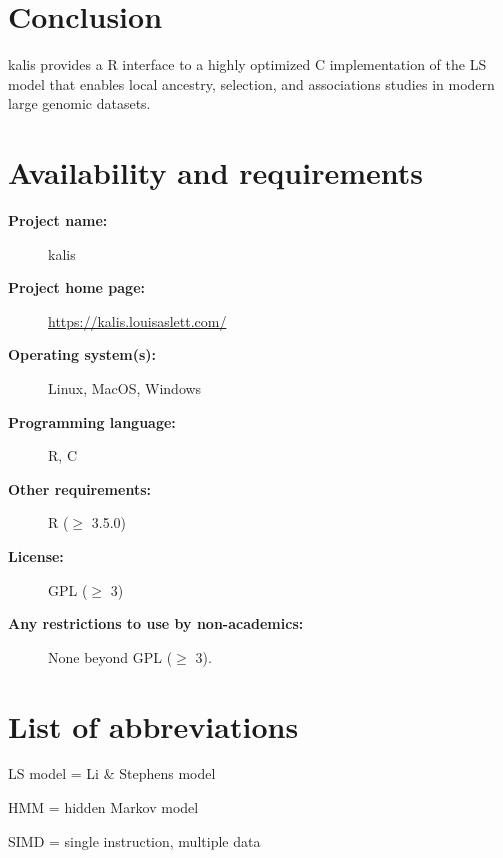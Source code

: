 \documentclass[pdflatex,referee,lineno,sn-nature]{sn-jnl}%
\let\proglang=\textsf
\newcommand{\pkg}[1]{{\fontseries{m}\fontseries{b}\selectfont #1}}
\begin{document}
\section*{Conclusion}

\pkg{kalis} provides a \proglang{R} interface to a highly optimized \proglang{C} implementation of the LS model that enables local ancestry, selection, and associations studies in modern large genomic datasets.



\section*{Availability and requirements}

\begin{description}
	\item[\textbf{Project name:}] \pkg{kalis}
	\item[\textbf{Project home page:}] \url{https://kalis.louisaslett.com/}
	\item[\textbf{Operating system(s):}] Linux, MacOS, Windows
	\item[\textbf{Programming language:}] \proglang{R}, \proglang{C}
	\item[\textbf{Other requirements:}] R ($\geq$ 3.5.0)
	\item[\textbf{License:}] GPL ($\geq$ 3)
	\item[\textbf{Any restrictions to use by non-academics:}] None beyond GPL ($\geq$ 3).
\end{description}



\section*{List of abbreviations}

\noindent
LS model = Li \& Stephens model

\noindent
HMM = hidden Markov model

\noindent
SIMD = single instruction, multiple data



\backmatter

\end{document}
